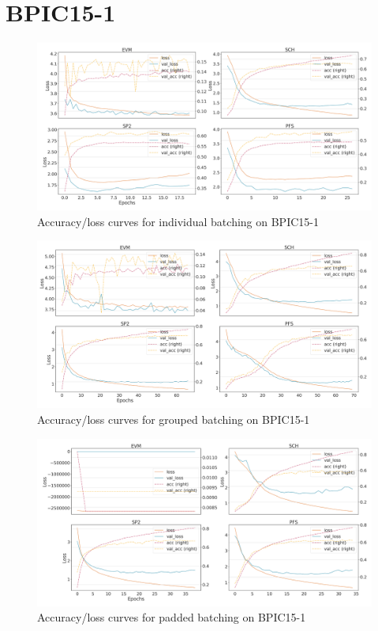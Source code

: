 \section*{BPIC15-1}
\begin{figure}[!htb]
    \centering
    \includegraphics[width=\textwidth]{gfx/bpic2015_1/individual_loss_acc_curve.png}
    \caption{Accuracy/loss curves for individual batching on BPIC15-1}
\end{figure}
\begin{figure}[!htb]
    \centering
    \includegraphics[width=\textwidth]{gfx/bpic2015_1/grouped_loss_acc_curve.png}
    \caption{Accuracy/loss curves for grouped batching on BPIC15-1}
\end{figure}
\begin{figure}[!htb]
    \centering
    \includegraphics[width=\textwidth]{gfx/bpic2015_1/padded_loss_acc_curve.png}
    \caption{Accuracy/loss curves for padded batching on BPIC15-1}
\end{figure}
